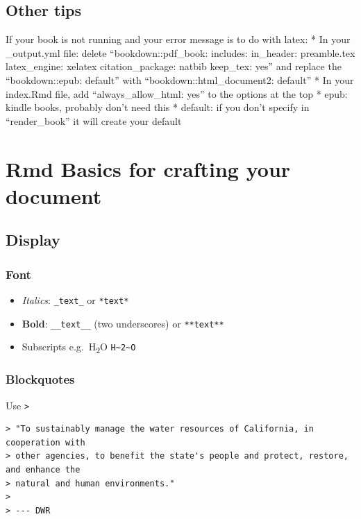 \documentclass[
]{book}
\providecommand{\tightlist}{%
  \setlength{\itemsep}{0pt}\setlength{\parskip}{0pt}}
\begin{document}
\hypertarget{other-tips}{%
\section{Other tips}\label{other-tips}}

If your book is not running and your error message is to do with latex:
* In your \_output.yml file: delete
``bookdown::pdf\_book:
includes:
in\_header: preamble.tex
latex\_engine: xelatex
citation\_package: natbib
keep\_tex: yes'' and replace the
``bookdown::epub: default'' with
``bookdown::html\_document2: default''
* In your index.Rmd file, add ``always\_allow\_html: yes'' to the options at the top
* epub: kindle books, probably don't need this
* default: if you don't specify in ``render\_book'' it will create your default

\hypertarget{RmdTools}{%
\chapter{Rmd Basics for crafting your document}\label{RmdTools}}

\hypertarget{display}{%
\section{Display}\label{display}}

\hypertarget{font}{%
\subsection{Font}\label{font}}

\begin{itemize}
\tightlist
\item
  \emph{Italics}: \texttt{\_text\_} or \texttt{*text*}
\item
  \textbf{Bold}: \texttt{\_\_text\_\_} (two underscores) or \texttt{**text**}
\item
  Subscripts e.g.~H\textsubscript{2}O \texttt{H\textasciitilde{}2\textasciitilde{}O}
\end{itemize}

\hypertarget{blockquotes}{%
\subsection{Blockquotes}\label{blockquotes}}

Use \texttt{\textgreater{}}

\begin{verbatim}
> "To sustainably manage the water resources of California, in cooperation with 
> other agencies, to benefit the state's people and protect, restore, and enhance the
> natural and human environments." 
> 
> --- DWR
\end{verbatim}
\end{document}
